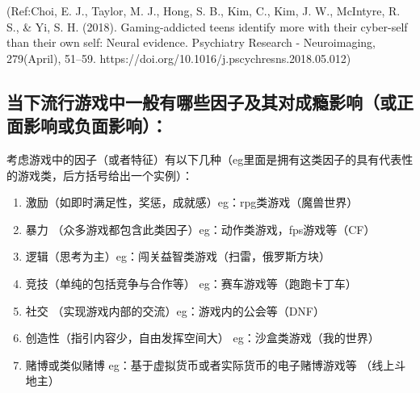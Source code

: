 (Ref:Choi, E. J., Taylor, M. J., Hong, S. B., Kim, C., Kim, J. W., McIntyre, R. S., & Yi, S. H. (2018). Gaming-addicted teens identify more with their cyber-self than their own self: Neural evidence. Psychiatry Research - Neuroimaging, 279(April), 51–59. https://doi.org/10.1016/j.pscychresns.2018.05.012)




\subsection{当下流行游戏中一般有哪些因子及其对成瘾影响（或正面影响或负面影响）：}
考虑游戏中的因子（或者特征）有以下几种（eg里面是拥有这类因子的具有代表性的游戏类，后方括号给出一个实例）：
\begin{enumerate}
\item 激励（如即时满足性，奖惩，成就感）eg：rpg类游戏（魔兽世界）
\item 暴力 （众多游戏都包含此类因子）eg：动作类游戏，fps游戏等（CF）
\item 逻辑（思考为主）eg：闯关益智类游戏（扫雷，俄罗斯方块）
\item 竞技（单纯的包括竞争与合作等） eg：赛车游戏等（跑跑卡丁车）
\item 社交 （实现游戏内部的交流）eg：游戏内的公会等（DNF）
\item 创造性（指引内容少，自由发挥空间大） eg：沙盒类游戏（我的世界）
\item 赌博或类似赌博 eg：基于虚拟货币或者实际货币的电子赌博游戏等 （线上斗地主）
\end{enumerate}


